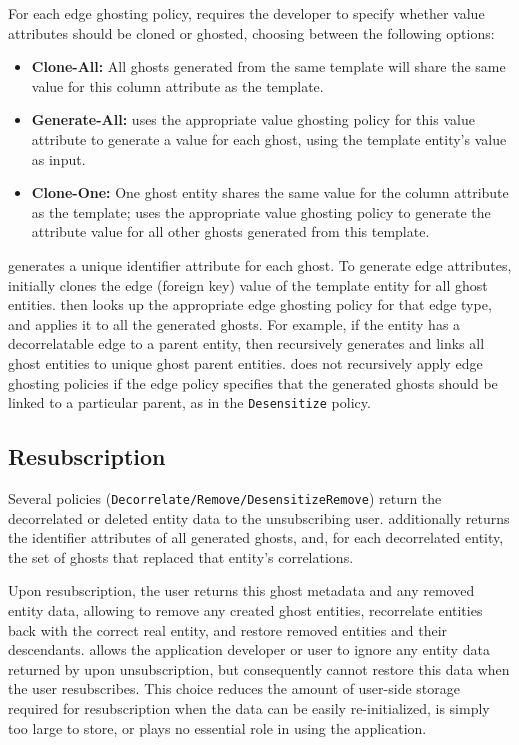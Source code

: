 For each edge ghosting policy, \sys requires the developer to specify whether value attributes
should be cloned or ghosted, choosing between the following options:
\begin{itemize}
    \item \textbf{Clone-All:} All ghosts generated from the same template will share the same value
        for this column attribute as the template.

    \item \textbf{Generate-All:} \sys uses the appropriate value ghosting policy for this
        value attribute to generate a value for each ghost, using the template entity's value
        as input.

    \item \textbf{Clone-One:} One ghost entity shares the same value for the column attribute as the
        template; \sys uses the appropriate value ghosting policy to generate the attribute value
        for all other ghosts generated from this template.
\end{itemize}

\sys generates a unique identifier attribute for each ghost.  To generate edge attributes, \sys
initially clones the edge (foreign key) value of the template entity for all ghost entities.  \sys
then looks up the appropriate edge ghosting policy for that edge type, and applies it to all the
generated ghosts. For example, if the entity has a decorrelatable edge to a parent entity, then \sys
recursively generates and links all ghost entities to unique ghost parent entities. \sys does not
recursively apply edge ghosting policies if the edge policy specifies that the generated ghosts
should be linked to a particular parent, as in the \texttt{Desensitize} policy. 

\subsection{Resubscription}
Several policies (\texttt{Decorrelate/Remove/Desensitize\-Remove}) return the decorrelated or deleted
entity data to the unsubscribing user. \sys additionally returns the identifier attributes of all
generated ghosts, and, for each decorrelated entity, the set of ghosts that replaced that entity's
correlations.

Upon resubscription, the user returns this ghost metadata and any removed entity data, allowing \sys
to remove any created ghost entities, recorrelate entities back with the correct real entity, and
restore removed entities and their descendants. \sys allows the application developer or user to
ignore any entity data returned by \sys upon unsubscription, but consequently cannot restore this
data when the user resubscribes.  This choice reduces the amount of user-side storage required for
resubscription when the data can be easily re-initialized, is simply too large to store, or plays no
essential role in using the application.
        
